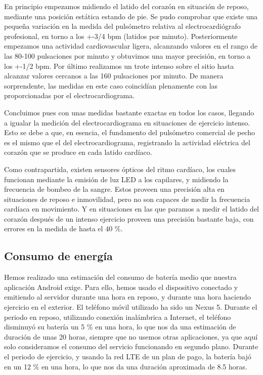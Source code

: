 En principio empezamos midiendo el latido del corazón en situación de reposo, mediante una posición estática estando de pie. Se pudo comprobar que existe una pequeña variación en la medida del pulsómetro relativa al electrocardiógrafo profesional, en torno a los +-3/4 bpm (latidos por minuto). Posteriormente empezamos una actividad cardiovascular ligera, alcanzando valores en el rango de las 80-100 pulsaciones por minuto y obtuvimos una mayor precisión, en torno a los +-1/2 bpm. Por último realizamos un trote intenso sobre el sitio hasta alcanzar valores cercanos a las 160 pulsaciones por minuto. De manera sorprendente, las medidas en este caso coincidían plenamente con las proporcionadas por el electrocardiograma.

Concluimos pues con unas medidas bastante exactas en todos los casos, llegando a igualar la medición del electrocardiograma en situaciones de ejercicio intenso. Esto se debe a que, en esencia, el fundamento del pulsómetro comercial de pecho es el mismo que el del electrocardiograma, registrando la actividad eléctrica del corazón que se produce en cada latido cardíaco.

Como contrapartida, existen sensores ópticos del ritmo cardíaco, los cuales funcionan mediante la emisión de luz LED a los capilares, y midiendo la frecuencia de bombeo de la sangre. Estos proveen una precisión alta en situaciones de reposo e inmovilidad, pero no son capaces de medir la frecuencia cardíaca en movimiento. Y en situaciones en las que paramos a medir el latido del corazón después de un intenso ejercicio proveen una precisión bastante baja, con errores en la medida de hasta el 40 \%.

\subsection{Consumo de energía}
Hemos realizado una estimación del consumo de batería medio que nuestra aplicación Android exige. Para ello, hemos usado el dispositivo conectado y emitiendo al servidor durante una hora en reposo, y durante una hora haciendo ejercicio en el exterior. El teléfono móvil utilizado ha sido un Nexus 5.
Durante el periodo en reposo, utilizando conexión inalámbrica a Internet, el teléfono disminuyó su batería un 5 \% en una hora, lo que nos da una estimación de duración de unas 20 horas, siempre que no usemos otras aplicaciones, ya que aquí solo consideramos el consumo del servicio funcionando en segundo plano.
Durante el periodo de ejercicio, y usando la red LTE de un plan de pago, la batería bajó en un 12 \% en una hora, lo que nos da una duración aproximada de 8.5 horas.

